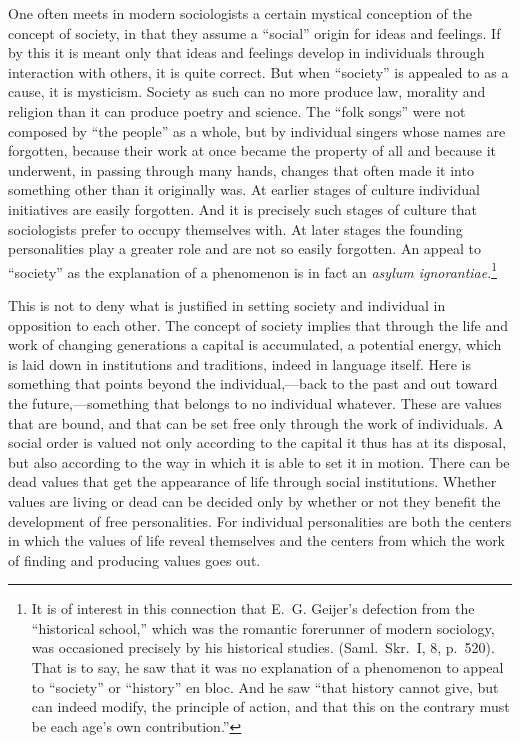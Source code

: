 \documentclass[12pt]{article}
\newcommand{\opage}[1]{\marginnote{\footnotesize\textit{[#1]}}}
\begin{document}
One often meets in modern sociologists a certain mystical conception of the
concept of society, in that they assume a ``social'' origin for ideas and
feelings. If by this it is meant only that ideas and feelings develop in
individuals through interaction with others, it is quite correct. But when
``society'' is appealed to as a cause, it is mysticism. Society as such can no
more produce law, morality and religion than it can produce poetry and science.
The ``folk songs'' were not composed by ``the people'' as a whole, but by
individual singers whose names are forgotten, because their work at once became
the property of all and because it underwent, in passing through many hands,
\opage{47}%
changes that often made it into something other than it originally was. At
earlier stages of culture individual initiatives are easily forgotten. And it is
precisely such stages of culture that sociologists prefer to occupy themselves
with. At later stages the founding personalities play a greater role and are not
so easily forgotten. An appeal to ``society'' as the explanation of a phenomenon
is in fact an \textit{asylum ignorantiae}.\footnote{It is of interest in this
connection that E.~G. Geijer's defection from the ``historical school,'' which
was the romantic forerunner of modern sociology, was occasioned precisely by his
historical studies. (Saml.\ Skr.\ I, 8, p.~520). That is to say, he saw that it
was no explanation of a phenomenon to appeal to ``society'' or ``history'' en
bloc. And he saw ``that history cannot give, but can indeed modify, the
principle of action, and that this on the contrary must be each age's own
contribution.''}

This is not to deny what is justified in setting society and individual in
opposition to each other. The concept of society implies that through the life
and work of changing generations a capital is accumulated, a potential energy,
which is laid down in institutions and traditions, indeed in language itself.
Here is something that points beyond the individual,---back to
\opage{48}%
the past and out toward the future,---something that belongs to no individual
whatever. These are values that are bound, and that can be set free only through
the work of individuals. A social order is valued not only according to the
capital it thus has at its disposal, but also according to the way in which it
is able to set it in motion. There can be dead values that get the appearance of
life through social institutions. Whether values are living or dead can be
decided only by whether or not they benefit the development of free
personalities. For individual personalities are both the centers in which the
values of life reveal themselves and the centers from which the work of finding
and producing values goes out.
\end{document}
